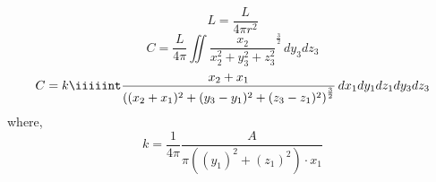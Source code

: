 \documentclass{article}
\begin{document}
 \begin{equation*}
   L = \frac{L}{4\pi r^2}
 \end{equation*}
 \begin{equation*}
   C = \frac{L}{4\pi} \iint \frac{x_2}{x_2^2 + y_3^2 +z_3^2}^{\frac{3}{2}} \, dy_3 dz_3
 \end{equation*}
 \begin{equation*}
   C = k\iiiiint \frac{x_2+x_1}{\left((x_2+x_1)^2+(y_3-y_1)^2+(z_3-z_1)^2\right)^\frac{3}{2}} \, dx_1 dy_1 dz_1 dy_3 dz_3
 \end{equation*}
 where,
 \begin{equation*}
  k = \frac{1}{4\pi}\frac{A}{\pi \left((y_1)^2+(z_1)^2\right)\cdot x_1} 
 \end{equation*}
\end{document}
